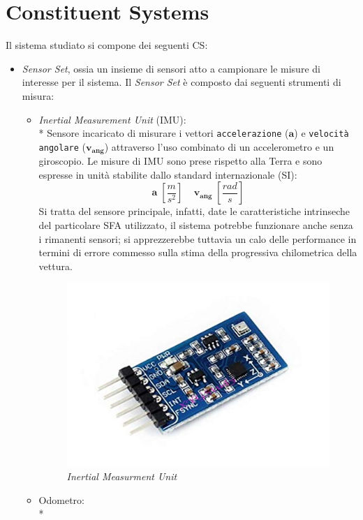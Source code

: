 \section{Constituent Systems}
Il sistema studiato si compone dei seguenti CS:
\begin{itemize}
	\item \emph{Sensor Set}, ossia un insieme di sensori atto a campionare le misure di interesse per il sistema. Il \emph{Sensor Set} \`e composto dai seguenti strumenti di misura:
	\begin{itemize}
		\item \emph{Inertial Measurement Unit} (IMU):\\*
		Sensore incaricato di misurare i vettori \texttt{accelerazione} ($\mathbf{a}$) e \texttt{velocit\`a angolare} ($\mathbf{v_{ang}}$) attraverso l'uso combinato di un accelerometro e un giroscopio. Le misure di IMU sono prese rispetto alla Terra e sono espresse in unit\`a stabilite dallo standard internazionale (SI):
		$$
		\mathbf{a}\;\left[\frac{m}{s^2}\right]\;\;\;\;\mathbf{v_{ang}}\;\left[ \frac{rad}{s} \right]
		$$
		Si tratta del sensore principale, infatti, date le caratteristiche intrinseche del particolare SFA utilizzato, il sistema potrebbe funzionare anche senza i rimanenti sensori; si apprezzerebbe tuttavia un calo delle performance in termini di errore commesso sulla stima della progressiva chilometrica della vettura.
		\begin{figure}[h]
			\centering
			\includegraphics[width=\linewidth]{img/imu}
			\caption{\emph{Inertial Measurment Unit}}
			\label{fig:imu}
		\end{figure}
		\item Odometro:\\*

\end{itemize}
\end{itemize}

